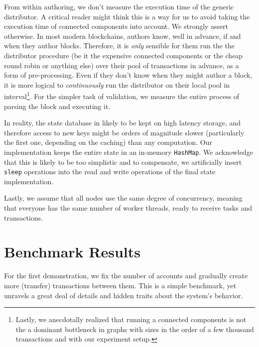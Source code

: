 From within authoring, we don't measure the execution time of the generic distributor. A critical
reader might think this is a way for us to avoid taking the execution time of connected components
into account. We strongly assert otherwise. In most modern blockchains, authors know, well in
advance, if and when they author blocks. Therefore, it is \textit{only} sensible for them run the
the distributor procedure (be it the expensive connected components or the cheap round robin or
anything else) over their pool of transactions in advance, as a form of pre-processing. Even if they
don't know when they might author a block, it is more logical to \textit{continuously} run the
distributor on their local pool in interval\footnote{Lastly, we anecdotally realized that running a
connected components is not the a dominant bottleneck in graphs with sizes in the order of a few
thousand transactions and with our experiment setup.}. For the simpler task of validation, we
measure the entire process of parsing the block and executing it.

In reality, the state database in likely to be kept on high latency storage, and therefore access to
new keys might be orders of magnitude slower (particularly the first one, depending on the caching)
than any computation. Our implementation keeps the entire state in an in-memory \texttt{HashMap}. We
acknowledge that this is likely to be too simplistic and to compensate, we artificially insert
\texttt{sleep} operations into the read and write operations of the final state implementation.


Lastly, we assume that all nodes use the same degree of concurrency, meaning that everyone has the
same number of worker threads, ready to receive tasks and transactions.

\section{Benchmark Results} \label{chap_b&a:sec:results}

For the first demonstration, we fix the number of accounts and gradually create more (transfer)
transactions between them. This is a simple benchmark, yet unravels a great deal of details and
hidden traits about the system's behavior.


